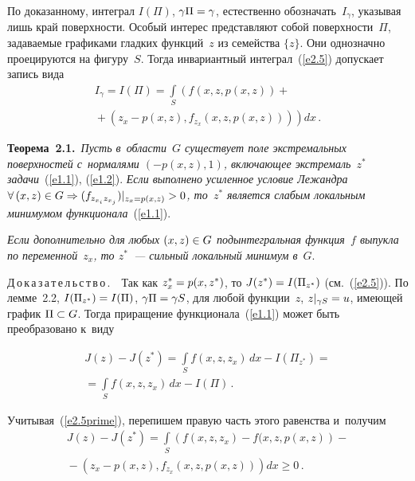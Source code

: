 \begin{multicols}{2}
\smallskip

    
    По доказанному, интеграл $I(\Pi)$, $\gamma\Pi\hm=\gamma$, естественно 
обозначать~$I_\gamma$, указывая лишь край поверхности. Особый интерес 
представляют собой поверхности~$\Pi$, задаваемые графиками гладких 
\mbox{функций}~$z$ из семейства $\{z\}$. Они однозначно проецируются на фигуру~$S$. 
Тогда инвариантный интеграл~(\ref{e2.5}) допускает запись вида
    \begin{multline}
    I_\gamma =I(\Pi) =\int\limits_S \left( f(x,z,p(x,z))+{}\right.\\
\left.    {}+\left( z_x -p(x,z), 
f_{z_x}(x,z,p(x,z))\right)\right)dx\,.
    \label{e2.5prime}
    \end{multline}
    
    \noindent
    \textbf{Теорема~2.1.}\ \textit{Пусть в~области~$G$ существует поле 
экстремальных поверхностей с~нормалями $(-p(x,z),1)$, вклю\-ча\-ющее 
экстремаль~$z^*$ задачи}~(\ref{e1.1}), (\ref{e1.2}). \textit{Если выполнено усиленное 
условие Лежандра $\forall \,(x,z)\hm\in G\hm\Rightarrow 
(f_{z_{x_i}z_{x_j}})\vert_{z_x=p(x,z)}\hm>0$, то~$z^*$ является слабым локальным 
минимумом функционала}~(\ref{e1.1}). 
    
    \textit{Если дополнительно для любых $(x,z)\hm\in G$ подынтегральная 
функция~$f$ выпукла по переменной~$z_x$, то $z^*$~--- сильный локальный 
минимум в}~$G$.
    
    \smallskip
    
    \noindent
    Д\,о\,к\,а\,з\,а\,т\,е\,л\,ь\,с\,т\,в\,о\,.\ \  Так как $z_x^*\hm= p(x,z^*)$, то 
$J(z^*)\hm= I(\Pi_{z^*})$ (см.~(\ref{e2.5})). По лемме~2.2, $I(\Pi_{z^*})\hm= I(\Pi)$, 
$\gamma\Pi\hm= \gamma S$, для любой функции~$z$, $z\vert_{\gamma S}\hm=u$, 
имеющей график $\Pi\hm\subset G$. Тогда приращение функционала~(\ref{e1.1}) 
может быть преобразовано к~виду

\noindent
\begin{multline*}
    J(z)-J(z^*) =\int\limits_S f(x,z,z_x)\, dx- I(\Pi_{z^*}) ={}\\
    {}=\int\limits_S f(x,z,z_x) \,dx -
I(\Pi)\,.
    \end{multline*}
    
Учитывая~(\ref{e2.5prime}), перепишем правую часть этого равенства и~получим 
\begin{multline}
J(z)-J(z^*) =\int\limits_S \left( f(x,z,z_x) -f(x,z,p(x,z)\right) -{}\\
{}-
\left( z_x -p(x,z), f_{z_x}(x,z,p(x,z))\right) dx\geq 0\,.
\label{e2.6}
\end{multline}



\end{multicols}

